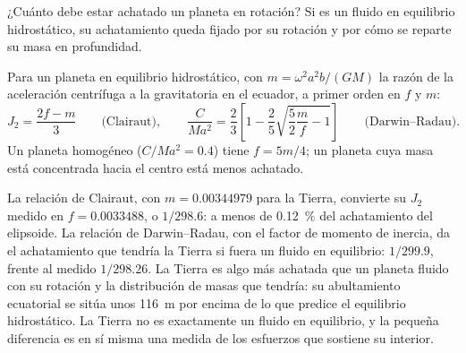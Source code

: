 ¿Cuánto debe estar achatado un planeta en rotación? Si es un fluido en
equilibrio hidrostático, su achatamiento queda fijado por su rotación y por cómo se
reparte su masa en profundidad.

\begin{proposition}\label{prop:b3:gravity-geodesy:clairaut}
Para un planeta en equilibrio hidrostático, con $m = \omega^2a^2b/(GM)$ la razón
de la aceleración centrífuga a la gravitatoria en el ecuador, a primer
orden en $f$ y $m$:
\[
  J_2 = \frac{2f - m}{3}\qquad\text{(Clairaut)},\qquad
  \frac{C}{Ma^2} = \frac23\left[1 - \frac25\sqrt{\frac52\frac mf - 1}\right]
  \qquad\text{(Darwin--Radau)} .
\]
Un planeta homogéneo ($C/Ma^2 = 0.4$) tiene $f = 5m/4$; un planeta cuya masa está
concentrada hacia el centro está menos achatado.
\end{proposition}
\admitted

La relación de Clairaut, con $m = \num{0.00344979}$ para la Tierra, convierte su
$J_2$ medido en $f = \num{0.0033488}$, o $1/298.6$: a menos de
\qty{0.12}{\percent} del achatamiento del elipsoide. La
relación de Darwin--Radau, con el factor de momento de inercia, da el achatamiento que tendría la Tierra
si fuera un fluido en equilibrio: $1/299.9$, frente al medido
$1/298.26$. La Tierra es algo más achatada que un planeta fluido con su rotación
y la distribución de masas que tendría: su abultamiento ecuatorial se sitúa unos
\qty{116}{m} por encima de lo que predice el equilibrio hidrostático. La Tierra no es
exactamente un fluido en equilibrio, y la pequeña diferencia es en sí misma una
medida de los esfuerzos que sostiene su interior.


